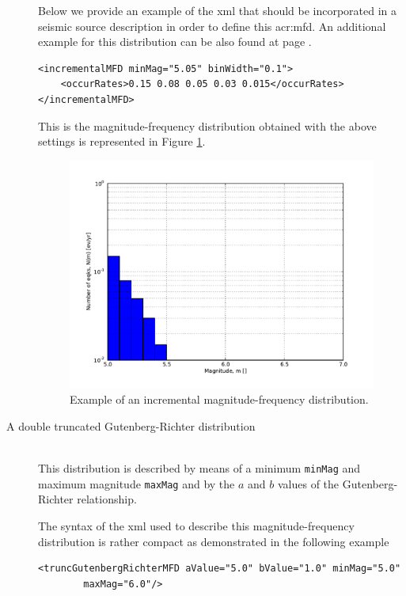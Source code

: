 \begin{description}
    Below we provide an example of the xml that should
    be incorporated in a seismic source description in order to define 
    this \gls{acr:mfd}. An additional example for this distribution can
    be also found at page \pageref{example_incremental_mfd}.
\begin{Verbatim}[frame=single, commandchars=\\\{\}, fontsize=\footnotesize]
<incrementalMFD minMag="5.05" binWidth="0.1">
    <occurRates>0.15 0.08 0.05 0.03 0.015</occurRates>
</incrementalMFD>
\end{Verbatim}
    This is the magnitude-frequency distribution obtained with the above
    settings is represented in Figure \ref{fig:evenly_discretized_mfd}.
\begin{figure}[!ht]
\centering
\includegraphics[width=12cm]{./figures/hazard/ed_mfd.pdf}
\caption{Example of an incremental magnitude-frequency distribution.}
\label{fig:evenly_discretized_mfd}
\end{figure}
%
\item[A double truncated Gutenberg-Richter distribution] \hfill \\
    This distribution is de\-scribed by means of a minimum \texttt{minMag}
    and maximum magnitude \texttt{maxMag} and by the $a$ and $b$ values 
    of the Gutenberg-Richter relationship. 
    
    The syntax of the xml used to describe this magnitude-frequency 
    distribution is rather compact as demonstrated in the following example
\begin{Verbatim}[frame=single, commandchars=\\\{\}, fontsize=\footnotesize]
<truncGutenbergRichterMFD aValue="5.0" bValue="1.0" minMag="5.0" 
        maxMag="6.0"/>
\end{Verbatim}


\end{description}
